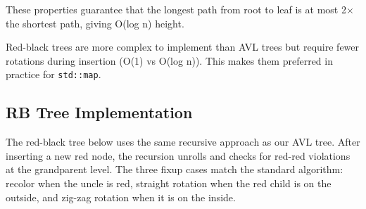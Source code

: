 These properties guarantee that the longest path from root to leaf is at most 2$\times $ the shortest path, giving O(log n) height.

Red-black trees are more complex to implement than AVL trees but require fewer rotations during insertion (O(1) vs O(log n)). This makes them preferred in practice for \texttt{std::map}.

\subsection{RB Tree Implementation}

The red-black tree below uses the same recursive approach as our AVL tree. After inserting a new red node, the recursion unrolls and checks for red-red violations at the grandparent level. The three fixup cases match the standard algorithm: recolor when the uncle is red, straight rotation when the red child is on the outside, and zig-zag rotation when it is on the inside.

